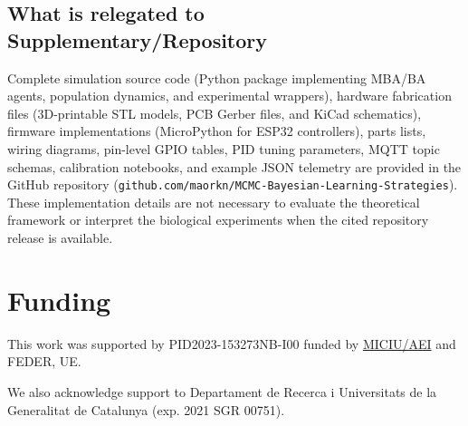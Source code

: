 \documentclass[aps,pre,twocolumn,floatfix,nofootinbib,amsmath,amssymb]{revtex4-2}
\begin{document}
\subsection{What is relegated to Supplementary/Repository}

Complete simulation source code (Python package implementing MBA/BA agents, population dynamics, and experimental wrappers), hardware fabrication files (3D-printable STL models, PCB Gerber files, and KiCad schematics), firmware implementations (MicroPython for ESP32 controllers), parts lists, wiring diagrams, pin-level GPIO tables, PID tuning parameters, MQTT topic schemas, calibration notebooks, and example JSON telemetry are provided in the GitHub repository (\texttt{github.com/maorkn/MCMC-Bayesian-Learning-Strategies}). These implementation details are not necessary to evaluate the theoretical framework or interpret the biological experiments when the cited repository release is available.
\section{Funding}
This work was supported by PID2023-153273NB-I00 funded by \href{https://doi.org/10.13039/501100011033}{MICIU/AEI} and FEDER, UE.

 We also acknowledge support to Departament de Recerca i Universitats de la Generalitat de Catalunya (exp. 2021 SGR 00751).

\renewcommand{\bibsection}{\section{References}}

\end{document}
